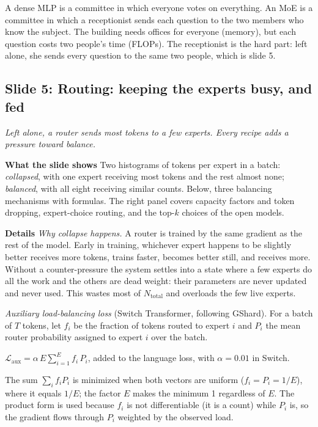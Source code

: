 \documentclass[11pt,letterpaper]{article}
\newcommand{\slide}[3]{%
  \subsection[Slide #1: #2]{Slide #1: #2}%
  {\color{muted}\itshape #3\par}\medskip}
\newcommand{\para}[1]{\medskip\noindent\textbf{#1}\quad}
\newenvironment{intuition}{\begin{tcolorbox}[intuitionbox]}{\end{tcolorbox}}
\newenvironment{formulas}{\begin{tcolorbox}[formulabox]}{\end{tcolorbox}}
\newcommand{\Ntot}{N_{\mathrm{total}}}\newcommand{\Neff}{N_{\mathrm{eff}}}
\begin{document}
\begin{intuition}
A dense MLP is a committee in which everyone votes on everything. An MoE is a committee in which a receptionist sends each question to the two members who know the subject. The building needs offices for everyone (memory), but each question costs two people's time (FLOPs). The receptionist is the hard part: left alone, she sends every question to the same two people, which is slide 5.
\end{intuition}

\slide{5}{Routing: keeping the experts busy, and fed}{Left alone, a router sends most tokens to a few experts. Every recipe adds a pressure toward balance.}

\para{What the slide shows} Two histograms of tokens per expert in a batch: \emph{collapsed}, with one expert receiving most tokens and the rest almost none; \emph{balanced}, with all eight receiving similar counts. Below, three balancing mechanisms with formulas. The right panel covers capacity factors and token dropping, expert-choice routing, and the top-$k$ choices of the open models.

\para{Details} \emph{Why collapse happens.} A router is trained by the same gradient as the rest of the model. Early in training, whichever expert happens to be slightly better receives more tokens, trains faster, becomes better still, and receives more. Without a counter-pressure the system settles into a state where a few experts do all the work and the others are dead weight: their parameters are never updated and never used. This wastes most of $\Ntot$ and overloads the few live experts.

\emph{Auxiliary load-balancing loss} (Switch Transformer, following GShard). For a batch of $T$ tokens, let $f_i$ be the fraction of tokens routed to expert $i$ and $P_i$ the mean router probability assigned to expert $i$ over the batch.
\begin{formulas}
$\mathcal{L}_{\text{aux}}=\alpha\,E\sum_{i=1}^{E} f_i\,P_i$, \quad added to the language loss, with $\alpha=0.01$ in Switch.
\end{formulas}
The sum $\sum_i f_iP_i$ is minimized when both vectors are uniform ($f_i=P_i=1/E$), where it equals $1/E$; the factor $E$ makes the minimum 1 regardless of $E$. The product form is used because $f_i$ is not differentiable (it is a count) while $P_i$ is, so the gradient flows through $P_i$ weighted by the observed load.
\end{document}
